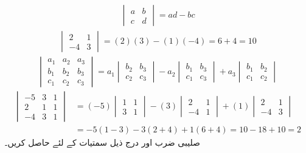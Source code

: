 \begin{align*}
\begin{vmatrix}a&b\\c&d  \end{vmatrix}=ad-bc
\end{align*}
\begin{align*}
\begin{vmatrix} 2&1\\-4&3 \end{vmatrix}=(2)(3)-(1)(-4)=6+4=10
\end{align*}
\begin{align*}
\begin{vmatrix} a_1&a_2&a_3\\ b_1&b_2&b_3\\c_1&c_2&c_3 \end{vmatrix}=
a_1\begin{vmatrix} b_2&b_3\\ c_2&c_3\end{vmatrix}-a_2\begin{vmatrix} b_1&b_3\\c_1&c_3 \end{vmatrix}+a_3\begin{vmatrix} b_1&b_2\\c_1&c_2 \end{vmatrix}
\end{align*}
\begin{align*}
\begin{vmatrix} -5&3&1\\2&1&1\\-4&3&1\end{vmatrix}&=
(-5)\begin{vmatrix} 1&1\\3&1\end{vmatrix}-(3)\begin{vmatrix}2 &1\\ -4&1\end{vmatrix}+(1)\begin{vmatrix} 2&1\\-4&3 \end{vmatrix}\\
&=-5(1-3)-3(2+4)+1(6+4)=10-18+10=2
\end{align*}
صلیبی ضرب  اور  درج ذیل سمتیات کے لئے حاصل کریں۔

